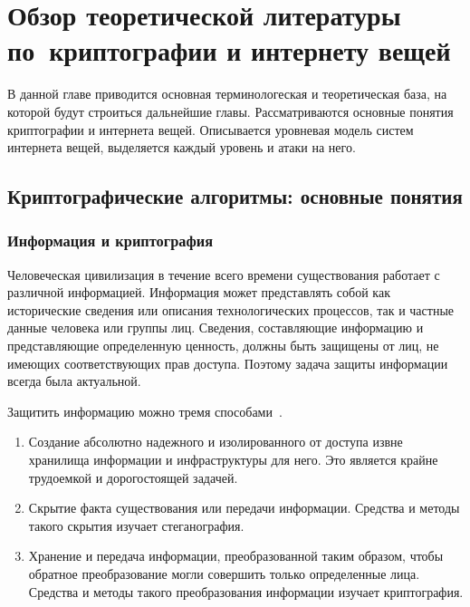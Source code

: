 \chapter{Обзор теоретической литературы по~криптографии и интернету вещей} \label{ch1}


В данной главе приводится основная терминологеская и теоретическая база, на которой будут строиться дальнейшие главы. Рассматриваются основные понятия криптографии и интернета вещей. Описывается уровневая модель систем интернета вещей, выделяется каждый уровень и атаки на него.

\section{Криптографические алгоритмы: основные понятия} \label{ch1:sec1}

\subsection{Информация и криптография} %

Человеческая цивилизация в течение всего времени существования работает с различной информацией. Информация может представлять собой как исторические сведения или описания технологических процессов, так и частные данные человека или группы лиц. Сведения, составляющие информацию и представляющие определенную ценность, должны быть защищены от лиц, не имеющих соответствующих прав доступа. Поэтому задача защиты информации всегда была актуальной. 

Защитить информацию можно тремя способами~\cite{src8}.
\begin{enumerate}
	\item Создание абсолютно надежного и изолированного от доступа извне хранилища информации и инфраструктуры для него. Это является крайне трудоемкой и дорогостоящей задачей.
	\item Скрытие факта существования или передачи информации. Средства и методы такого скрытия изучает стеганография.
	\item Хранение и передача информации, преобразованной таким образом, чтобы обратное преобразование могли совершить только определенные лица. Средства и методы такого преобразования информации изучает криптография.
\end{enumerate} 

